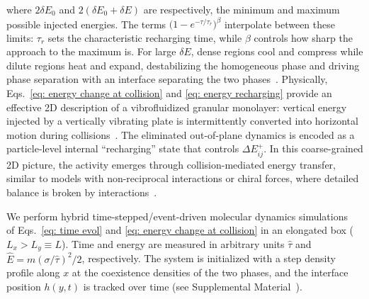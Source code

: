 \documentclass[aps,
reprint,
superscriptaddress,









amsmath,amssymb,floatfix,






prl
]{revtex4-2}
\begin{document}
where $2\delta E_0$ and $2(\delta E_0+\delta E)$ are respectively, the minimum and maximum possible injected energies. The terms $\big(1-e^{-\tau/\tau_r}\big)^\beta$ interpolate between these limits: $\tau_r$ sets the characteristic recharging time, while $\beta$ controls how sharp the approach to the maximum is. For large $\delta E$, dense regions cool and compress while dilute regions heat and expand, destabilizing the homogeneous phase and driving phase separation with an interface separating the two phases~\cite{risso2018effective, maire2025hyperuniform}. Physically, Eqs.~\eqref{eq: energy change at collision} and \eqref{eq: energy recharging} provide an effective 2D description of a vibrofluidized granular monolayer: vertical energy injected by a vertically vibrating plate is intermittently converted into horizontal motion during collisions~\cite{brito2013hydrodynamic}. The eliminated out-of-plane dynamics is encoded as a particle-level internal ``recharging'' state that controls $\Delta E^+_{ij}$. In this coarse-grained 2D picture, the activity emerges through collision-mediated energy transfer, similar to models with non-reciprocal interactions or chiral forces, where detailed balance is broken by interactions~\cite{Caprini2025bubble, Ouazan2023}.


We perform hybrid time-stepped/event-driven molecular dynamics simulations~\cite{smallenburg2022efficient} of Eqs.~\eqref{eq: time evol} and \eqref{eq: energy change at collision} in an elongated box ($L_x>L_y\equiv L$). Time and energy are measured in arbitrary units $\hat\tau$ and $\hat E=m(\sigma/\hat\tau)^2/2$, respectively. The system is initialized with a step density profile along $x$ at the coexistence densities of the two phases, and the interface position $h(y, t)$ is tracked over time (see Supplemental Material~\cite{supp}).
\end{document}
